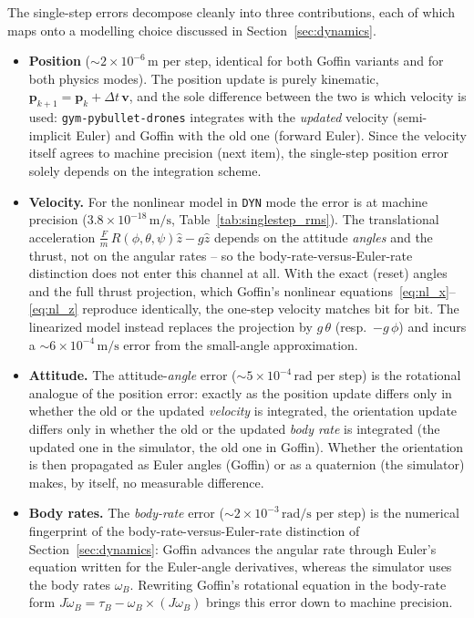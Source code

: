 \documentclass[11pt,a4paper]{article}
\theoremstyle{remark}
\numberwithin{equation}{section}
\begin{document}
The single-step errors decompose cleanly into three contributions, each of which
maps onto a modelling choice discussed in Section~\ref{sec:dynamics}.
\begin{itemize}
    \item \textbf{Position} ($\sim 2\times10^{-6}\,\mathrm{m}$ per step,
    identical for both Goffin variants and for both physics modes). The position
    update is purely kinematic, $\mathbf{p}_{k+1} = \mathbf{p}_k +
    \Delta t\,\mathbf{v}$, and the sole difference between the two is which
    velocity is used: \texttt{gym-pybullet-drones} integrates with the
    \emph{updated} velocity (semi-implicit Euler) and Goffin with the old one
    (forward Euler). Since the velocity itself agrees to machine precision (next
    item), the single-step position error solely depends on the integration scheme.
    \item \textbf{Velocity.} For the nonlinear model in \texttt{DYN} mode the
    error is at machine precision ($3.8\times10^{-18}\,\mathrm{m/s}$,
    Table~\ref{tab:singlestep_rms}). The translational acceleration
    $\tfrac{F}{m}\,R(\phi,\theta,\psi)\hat{z} - g\hat{z}$ depends on the attitude
    \emph{angles} and the thrust, not on the angular rates -- so the
    body-rate-versus-Euler-rate distinction does not enter this channel at all.
    With the exact (reset) angles and the full thrust projection, which Goffin's
    nonlinear equations~\eqref{eq:nl_x}--\eqref{eq:nl_z} reproduce identically, the
    one-step velocity matches bit for bit. The linearized model instead replaces
    the projection by $g\,\theta$ (resp.\ $-g\,\phi$) and incurs a
    $\sim 6\times10^{-4}\,\mathrm{m/s}$ error from the small-angle approximation.
    \item \textbf{Attitude.} The attitude-\emph{angle} error
    ($\sim 5\times10^{-4}\,\mathrm{rad}$ per step) is the rotational
    analogue of the position error: exactly as the position update differs only in
    whether the old or the updated \emph{velocity} is integrated, the orientation
    update differs only in whether the old or the updated \emph{body rate} is
    integrated (the updated one in the simulator, the old one in Goffin).
    Whether the orientation is then propagated as Euler angles (Goffin) or as a
    quaternion (the simulator) makes, by itself, no measurable difference.
    \item \textbf{Body rates.} The
    \emph{body-rate} error ($\sim 2\times10^{-3}\,\mathrm{rad/s}$ per step) is the
    numerical fingerprint of the body-rate-versus-Euler-rate distinction of
    Section~\ref{sec:dynamics}: Goffin advances the angular rate through Euler's
    equation written for the Euler-angle derivatives, whereas the simulator uses
    the body rates $\omega_B$. Rewriting Goffin's rotational equation in the
    body-rate form $J\dot{\omega}_B = \tau_B - \omega_B\times(J\omega_B)$ brings
    this error down to machine precision.
\end{itemize}
\end{document}
